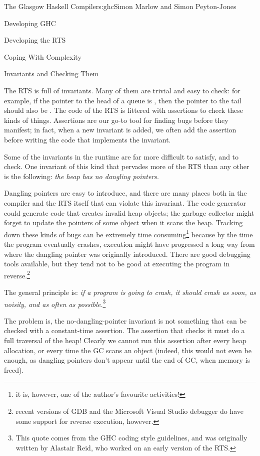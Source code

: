 \begin{aosachapter}{The Glasgow Haskell Compiler}{s:ghc}{Simon Marlow and Simon Peyton-Jones}
\begin{aosasect1}{Developing GHC}
\begin{aosasect2}{Developing the RTS}
\begin{aosasect3}{Coping With Complexity}
\end{aosasect3}

\begin{aosasect3}{Invariants and Checking Them}

The RTS is full of invariants.  Many of them are trivial and easy to
check: for example, if the pointer to the head of a queue is
, then the pointer to the tail should also be .
The code of the RTS is littered with assertions to check these kinds
of things.  Assertions are our go-to tool for finding bugs before they
manifest; in fact, when a new invariant is added, we often add the
assertion before writing the code that implements the invariant.

Some of the invariants in the runtime are far more difficult to
satisfy, and to check.  One invariant of this kind that pervades more
of the RTS than any other is the following: \emph{the heap has no
  dangling pointers}.

Dangling pointers are easy to introduce, and there are many places
both in the compiler and the RTS itself that can violate this
invariant.  The code generator could generate code that creates
invalid heap objects; the garbage collector might forget to update the
pointers of some object when it scans the heap.  Tracking down these
kinds of bugs can be extremely time consuming\footnote{it is, however,
  one of the author's favourite activities!} because by the time the
program eventually crashes, execution might have progressed a long way
from where the dangling pointer was originally introduced.  There are
good debugging tools available, but they tend not to be good at
executing the program in reverse.\footnote{recent versions of GDB and
  the Microsoft Visual Studio debugger do have some support for
  reverse execution, however.}

The general principle is: \emph{if a program is going to crash, it
  should crash as soon, as noisily, and as often as
  possible.}\footnote{This quote comes from the GHC coding style
  guidelines, and was originally written by Alastair Reid, who worked
  on an early version of the RTS.}

The problem is, the no-dangling-pointer invariant is not something
that can be checked with a constant-time assertion.  The assertion
that checks it must do a full traversal of the heap!  Clearly we
cannot run this assertion after every heap allocation, or every time
the GC scans an object (indeed, this would not even be enough, as
dangling pointers don't appear until the end of GC, when memory is
freed).


\end{aosasect3}
\end{aosasect2}
\end{aosasect1}
\end{aosachapter}
